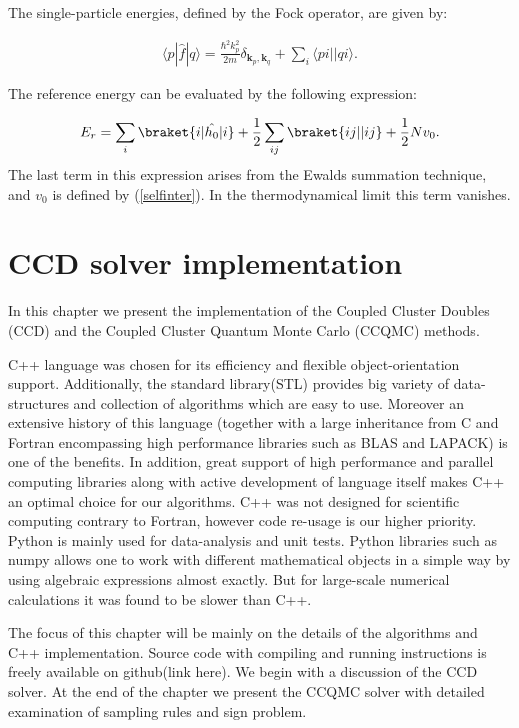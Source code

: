 \documentclass[twoside,english]{uiofysmaster}
\begin{document}
The single-particle energies, defined by the Fock operator, are given by: 

\begin{align}
\langle p|\hat{f}|q \rangle
= \frac{\hbar^{2}k_{p}^{2}}{2m}\delta_{\mathbf{k}_{p},
	\mathbf{k}_{q}} + \sum_{i}\langle pi||qi \rangle.
\tag{7}
\end{align}

The reference energy can be evaluated by the following expression:

\begin{equation}
E_r = \sum_i \braket{i|\hat{h_0}|i} + \frac{1}{2}\sum_{ij}\braket{ij||ij} + \frac{1}{2}Nv_0.
\end{equation}
The last term in this expression arises from the Ewalds summation technique, and $v_0$ is defined by (\ref{selfinter}). In the thermodynamical limit this term vanishes.

\chapter{CCD solver implementation}\label{Implementchapter}

In this chapter we present the implementation of the Coupled Cluster
Doubles (CCD) and the Coupled Cluster Quantum Monte Carlo (CCQMC)
methods.

C++ language was chosen for its efficiency and flexible
object-orientation support.  Additionally, the standard library(STL)
provides big variety of data-structures and collection of algorithms
which are easy to use. Moreover an extensive history of this language
(together with a large inheritance from C and Fortran encompassing
high performance libraries such as BLAS and LAPACK) is one of the
benefits.  In addition, great support of high performance and parallel
computing libraries along with active development of language itself
makes C++ an optimal choice for our algorithms.  C++ was not designed
for scientific computing\cite{Stroustrupprogramminglanguage2013}
contrary to Fortran, however code re-usage is our higher priority.
Python is mainly used for data-analysis and unit tests. Python
libraries such as numpy allows one to work with different mathematical
objects in a simple way by using algebraic expressions almost
exactly. But for large-scale numerical calculations it was found to be
slower than C++.

The focus of this chapter will be mainly on the details of the
algorithms and C++ implementation. Source code with compiling and
running instructions is freely available on github(link here).  We
begin with a discussion of the CCD solver. At the end of the chapter we
present the CCQMC solver with detailed examination of sampling rules
and sign problem.
\end{document}
